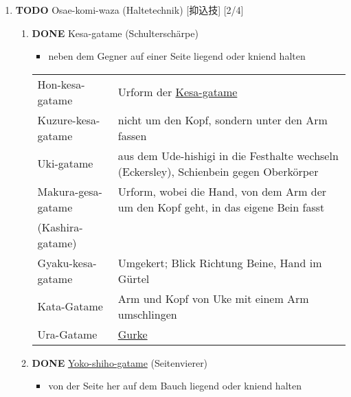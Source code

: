 \documentclass[11pt]{article}
\begin{document}
\begin{enumerate}
\item {\bfseries\sffamily TODO} Osae-komi-waza (Haltetechnik) [抑込技] [2/4]
\label{sec:orga734bce}

\begin{enumerate}
\item {\bfseries\sffamily DONE} \label{org0fccb72}Kesa-gatame (Schulterschärpe)
\label{sec:org82cdeb3}
\begin{itemize}
\item neben dem Gegner auf einer Seite liegend oder kniend halten
\end{itemize}

\begin{center}
\begin{tabular}{ll}
\label{org3ab0f91}Hon-kesa-gatame & Urform der \hyperref[org0fccb72]{Kesa-gatame}\\
\label{org71a3940}Kuzure-kesa-gatame & nicht um den Kopf, sondern unter den Arm fassen\\
\label{orgb1f51e2}Uki-gatame & aus dem Ude-hishigi in die Festhalte wechseln (Eckersley), Schienbein gegen Oberkörper\\
\label{org61850d2}Makura-gesa-gatame & Urform, wobei die Hand, von dem Arm der um den Kopf geht, in das eigene Bein fasst\\
(Kashira-gatame) & \\
\label{orgb717a37}Gyaku-kesa-gatame & Umgekert; Blick Richtung Beine, Hand im Gürtel\\
\label{org9c0034c}Kata-Gatame & Arm und Kopf von Uke mit einem Arm umschlingen\\
\label{orgac6ca0d}Ura-Gatame & \hyperref[org68a906c]{Gurke}\\
\end{tabular}
\end{center}

\item {\bfseries\sffamily DONE} \hyperref[org6ebb80c]{Yoko-shiho-gatame} (Seitenvierer)
\label{sec:org0940a0e}
\begin{itemize}
\item von der Seite her auf dem Bauch liegend oder kniend halten
\end{itemize}


\end{enumerate}
\end{enumerate}
\end{document}
